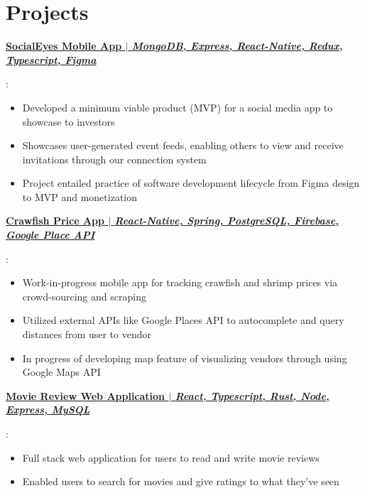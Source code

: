 \documentclass[letterpaper,11pt]{article}
\newcommand{\resumeItem}[2]{
  \item\small{
    \textbf{#1}{: #2 \vspace{-2pt}}
  }
}
\newcommand{\resumeSubItem}[2]{\resumeItem{#1}{#2}\vspace{-4pt}}
\newcommand{\resumeSubHeadingListStart}{\begin{itemize}[leftmargin=*]}
\newcommand{\resumeSubHeadingListEnd}{\end{itemize}}
\begin{document}
\section{Projects}
\resumeSubHeadingListStart
    \resumeSubItem{\href{https://github.com/matterwin/csc4330}{SocialEyes Mobile App $\vert$ \textnormal{\textit{MongoDB, Express, React-Native, Redux, Typescript, Figma}}}}{%
        \vspace{-7pt}
        \begin{itemize}
                  \item Developed a minimum viable product (MVP) for a social media app to showcase to investors
                  \item Showcases user-generated event feeds, enabling others to view and receive invitations through our connection system
            \item Project entailed practice of software development lifecycle from Figma design to MVP and monetization\vspace{-2pt}
        \end{itemize}
    }
            \resumeSubItem{\href{https://github.com/matterwin/crawfish_shrimp_app}{Crawfish Price App $\vert$ \textnormal{\textit{React-Native, Spring, PostgreSQL, Firebase, Google Place API}}}}{%
        \vspace{-7pt}
        \begin{itemize}
            \item Work-in-progress mobile app for tracking crawfish and shrimp prices via crowd-sourcing and scraping \vspace{-2pt}
            \item Utilized external APIs like Google Places API to autocomplete and query distances from user to vendor \vspace{-2pt}
            \item In progress of developing map feature of visualizing vendors through using Google Maps API\vspace{-2pt}
        \end{itemize}
        \resumeSubItem{\href{https://github.com/matterwin/CSC4402-Spring23}{Movie Review Web Application $\vert$ \textnormal{\textit{React, Typescript, Rust, Node, Express, MySQL}}}}{%
        \vspace{-7pt}
        \begin{itemize} %
            \item Full stack web application for users to read and write movie reviews \vspace{-2pt}
            \item Enabled users to search for movies and give ratings to what they've seen
        \end{itemize}
    }
    }
\resumeSubHeadingListEnd


\end{document}
